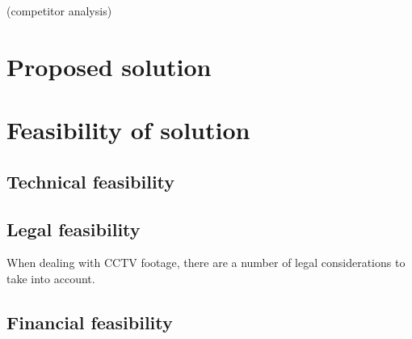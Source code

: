 (competitor analysis)

\section{Proposed solution}
\label{sec:solution}


\section{Feasibility of solution}
\label{sec:feasibility}
\subsection{Technical feasibility}
\subsection{Legal feasibility}
When dealing with CCTV footage, there are a number of legal considerations to take into account.

\subsection{Financial feasibility}


